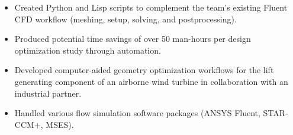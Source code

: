 \documentclass[10.5pt,a4paper,ragged2e]{altacv}
\begin{document}
\divider

\begin{itemize}
\item Created Python and Lisp scripts to complement the team's existing Fluent CFD workflow (meshing, setup, solving, and postprocessing).
\item Produced potential time savings of over 50 man-hours per design optimization study through automation.
\end{itemize}

\divider

\begin{itemize}
\item Developed computer-aided geometry optimization workflows for the lift generating component of an airborne wind turbine in collaboration with an industrial partner.
\item Handled various flow simulation software packages (ANSYS Fluent, STAR-CCM+, MSES).
\end{itemize}





\medskip
\end{document}
